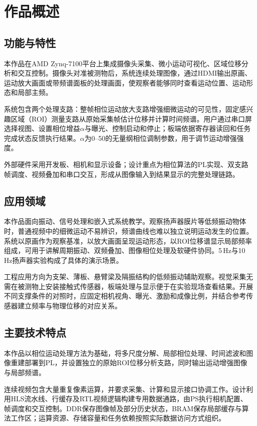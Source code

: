 \section{作品概述}
\label{sec:overview}

\subsection{功能与特性}
本作品在AMD Zynq-7100平台上集成摄像头采集、微小运动可视化、区域位移分析和交互控制。摄像头对准被测物后，系统连续处理图像，通过HDMI输出原画、运动放大画面或带频谱面板的处理画面，使观察者能够同时查看运动位置、运动形态和局部主频。

系统包含两个处理支路：整帧相位运动放大支路增强细微运动的可见性，固定感兴趣区域（ROI）测量支路从原始采集帧估计位移并计算时间频谱。用户通过串口屏选择视图、设置相位增益$\alpha$与曝光、控制启动和停止；板端依据寄存器读回和任务完成状态反馈执行结果。$\alpha$为0--50的无量纲相位调制参数，用于调节运动增强强度。

外部硬件采用开发板、相机和显示设备；设计重点为相位算法的PL实现、双支路帧调度、视频叠加和串口交互，形成从图像输入到结果显示的完整处理链路。

\subsection{应用领域}
本作品面向振动、信号处理和嵌入式系统教学。观察扬声器膜片等低频振动物体时，普通视频中的细微运动不易辨识，频谱曲线也难以独立说明运动发生的位置。系统以原画作为观察基准，以放大画面呈现运动形态，以ROI位移谱显示局部频率组成，可用于讲解周期振动、双频叠加、图像相位处理及软硬件协同。5\,Hz与10\,Hz扬声器实验构成了具体的演示场景。

工程应用方向为支架、薄板、悬臂梁及隔振结构的低频振动辅助观察。视觉采集无需在被测物上安装接触式传感器，板端处理与显示便于在实验现场查看结果。开展不同支撑条件的对照时，应固定相机视角、曝光、激励和成像比例，并结合参考传感器建立频率与物理位移的对应关系。

\subsection{主要技术特点}
本作品以相位运动处理方法\cite{wadhwa2013}为基础，将多尺度分解、局部相位处理、时间滤波和图像重建部署到PL，并设置独立的原始ROI位移分析支路，同时输出运动增强图像与局部频谱。

连续视频包含大量重复像素运算，并要求采集、计算和显示接口协调工作。设计利用HLS流水线、行缓存及RTL视频逻辑构建专用数据通路，由PS执行相机配置、帧调度和交互控制。DDR保存图像帧及部分历史状态，BRAM保存局部缓存与算法工作区；运算资源、存储容量和任务依赖按照实际数据访问方式组织。

